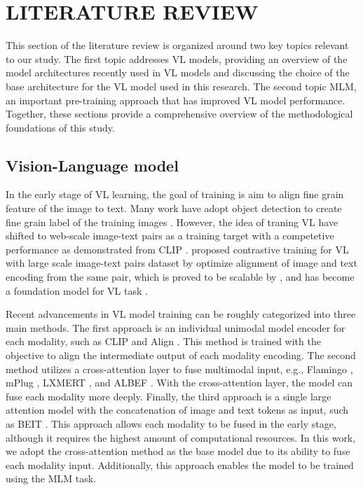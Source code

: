 \chapter{LITERATURE REVIEW}
This section of the literature review is organized around two key topics relevant to our study.
The first topic addresses VL models, providing an overview of the model architectures recently used in VL models and discussing the choice of the base architecture for the VL model used in this research.
The second topic MLM, an important pre-training approach that has improved VL model performance.
Together, these sections provide a comprehensive overview of the methodological foundations of this study.

\section{Vision-Language model}
In the early stage of VL learning, the goal of training is aim to align fine grain feature of the image to text.
Many work have adopt object detection to create fine grain label of the training images \cite{uniter, vlmo}.
However, the idea of traning VL have shifted to web-scale image-text pairs as a training target with a competetive performance as demonstrated from CLIP \cite{clip}.
 proposed contrastive training for VL with large scale image-text pairs dataset by optimize alignment of image and text encoding from the same pair, which is proved to be scalable by , and has become a foundation model for VL task \cite{foundation_model}. 

Recent advancements in VL model training can be roughly categorized into three main methods.
The first approach is an individual unimodal model encoder for each modality, such as CLIP \cite{clip} and Align \cite{align}.
This method is trained with the objective to align the intermediate output of each modality encoding. 
The second method utilizes a cross-attention layer to fuse multimodal input, e.g., Flamingo \cite{flamingo}, mPlug \cite{mplug}, LXMERT \cite{lxmert}, and ALBEF \cite{albef}. 
With the cross-attention layer, the model can fuse each modality more deeply. 
Finally, the third approach is a single large attention model with the concatenation of image and text tokens as input, such as BEIT \cite{beit-3}. 
This approach allows each modality to be fused in the early stage, although it requires the highest amount of computational resources.
In this work, we adopt the cross-attention method as the base model due to its ability to fuse each modality input.
Additionally, this approach enables the model to be trained using the MLM task.




